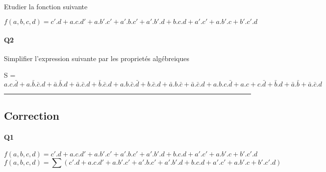 Etudier la fonction suivante

$$f(a,b,c,d)=  c'.d + a.c.d' + a.b'.c' + a'.b.c' + a'.b'.d  +  b.c.d + a'.c' + a.b'.c + b'.c'.d $$


\paragraph{Q2}

Simplifier l'expression suivante par les proprietés algébreiques 

S = $ a.c.\bar d + a.\bar b.\bar c.d  +  \bar a.\bar b.d + \bar a.\bar c.d + \bar b.\bar c.d + a.b.\bar c.\bar d  +  b.\bar c.d + \bar a.b.\bar c + \bar a.\bar c.d + a.b.c.\bar d  +  a.c + c.\bar d + \bar b.d + \bar a.\bar b + \bar a.\bar c.d $


\hrule width 1\linewidth
\pagebreak

\subsection{Correction}


\paragraph{Q1}

$$f(a,b,c,d)= c'.d + a.c.d' + a.b'.c' + a'.b.c' + a'.b'.d  +  b.c.d + a'.c' + a.b'.c + b'.c'.d $$
$$f(a,b,c,d)=\sum(c'.d + a.c.d' + a.b'.c' + a'.b.c' + a'.b'.d  +  b.c.d + a'.c' + a.b'.c + b'.c'.d)$$

